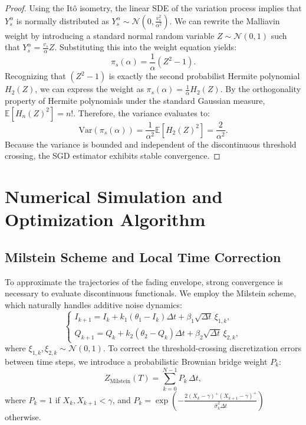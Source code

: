 \documentclass[11pt]{article}
\begin{document}
\begin{proof}
Using the Itô isometry, the linear SDE of the variation process implies that $Y_s^\alpha$ is normally distributed as $Y_s^\alpha \sim \mathcal{N}\left(0, \frac{v_s^2}{\alpha^2}\right)$. We can rewrite the Malliavin weight by introducing a standard normal random variable $Z \sim \mathcal{N}(0,1)$ such that $Y_s^\alpha = \frac{v_s}{\alpha} Z$. Substituting this into the weight equation yields:
\begin{equation}
    \pi_s(\alpha) = \frac{1}{\alpha} (Z^2 - 1).
\end{equation}
Recognizing that $(Z^2 - 1)$ is exactly the second probabilist Hermite polynomial $H_2(Z)$, we can express the weight as $\pi_s(\alpha) = \frac{1}{\alpha} H_2(Z)$. By the orthogonality property of Hermite polynomials under the standard Gaussian measure, $\mathbb{E}[H_n(Z)^2] = n!$. Therefore, the variance evaluates to:
\begin{equation}
    \text{Var}(\pi_s(\alpha)) = \frac{1}{\alpha^2} \mathbb{E}[H_2(Z)^2] = \frac{2}{\alpha^2}.
\end{equation}
Because the variance is bounded and independent of the discontinuous threshold crossing, the SGD estimator exhibits stable convergence.
\end{proof}

\section{Numerical Simulation and Optimization Algorithm}\label{sec:numerical} 

\subsection{Milstein Scheme and Local Time Correction}

To approximate the trajectories of the fading envelope, strong convergence is necessary to evaluate discontinuous functionals. We employ the Milstein scheme, which naturally handles additive noise dynamics:
\begin{equation}\label{eq:milstein}
\begin{cases}
    I_{k+1} = I_k + k_1(\theta_1 - I_k)\Delta t + \beta_1 \sqrt{\Delta t} \, \xi_{1,k}, \\
    Q_{k+1} = Q_k + k_2(\theta_2 - Q_k)\Delta t + \beta_2 \sqrt{\Delta t} \, \xi_{2,k},
\end{cases}
\end{equation}
where $\xi_{1,k}, \xi_{2,k} \sim \mathcal{N}(0,1)$. To correct the threshold-crossing discretization errors between time steps, we introduce a probabilistic Brownian bridge weight $P_k$:
\begin{equation}
    Z_{\text{Milstein}}(T) = \sum_{k=0}^{N-1} P_k \, \Delta t,
\end{equation}
where $P_k = 1$ if $X_k, X_{k+1} < \gamma$, and $P_k = \exp\left( - \frac{2 (X_k - \gamma)^+ (X_{k+1} - \gamma)^+}{\hat{\sigma}_k^2 \Delta t} \right)$ otherwise.
\end{document}
